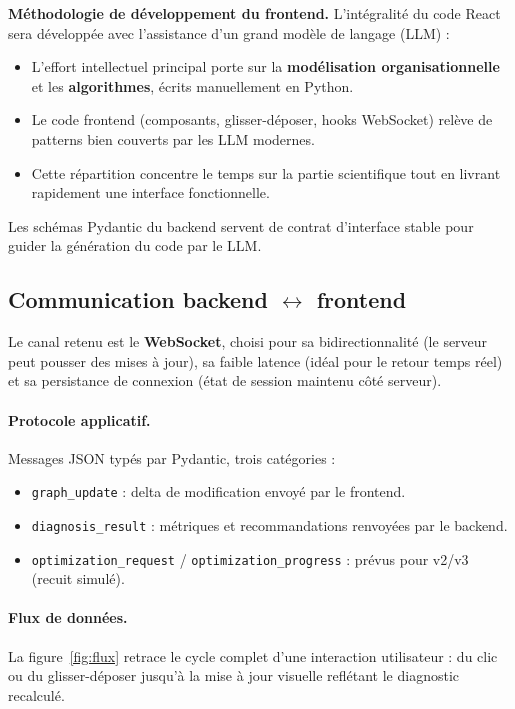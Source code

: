 \documentclass[11pt,a4paper]{article}
\begin{document}
\begin{infobox}
\textbf{Méthodologie de développement du frontend.} L'intégralité du code React sera développée avec l'assistance d'un grand modèle de langage (LLM) :
\begin{itemize}[leftmargin=*]
    \item L'effort intellectuel principal porte sur la \textbf{modélisation organisationnelle} et les \textbf{algorithmes}, écrits manuellement en Python.
    \item Le code frontend (composants, glisser-déposer, hooks WebSocket) relève de patterns bien couverts par les LLM modernes.
    \item Cette répartition concentre le temps sur la partie scientifique tout en livrant rapidement une interface fonctionnelle.
\end{itemize}
Les schémas Pydantic du backend servent de contrat d'interface stable pour guider la génération du code par le LLM.
\end{infobox}

\subsection{Communication backend $\leftrightarrow$ frontend}

Le canal retenu est le \textbf{WebSocket}, choisi pour sa bidirectionnalité (le serveur peut pousser des mises à jour), sa faible latence (idéal pour le retour temps réel) et sa persistance de connexion (état de session maintenu côté serveur).

\paragraph{Protocole applicatif.} Messages JSON typés par Pydantic, trois catégories :

\begin{itemize}[leftmargin=*]
    \item \texttt{graph\_update} : delta de modification envoyé par le frontend.
    \item \texttt{diagnosis\_result} : métriques et recommandations renvoyées par le backend.
    \item \texttt{optimization\_request} / \texttt{optimization\_progress} : prévus pour v2/v3 (recuit simulé).
\end{itemize}

\paragraph{Flux de données.} La figure~\ref{fig:flux} retrace le cycle complet d'une interaction utilisateur : du clic ou du glisser-déposer jusqu'à la mise à jour visuelle reflétant le diagnostic recalculé.
\end{document}
